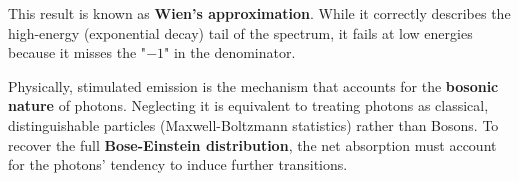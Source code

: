 This result is known as \textbf{Wien's approximation}. While it correctly describes the high-energy (exponential decay) tail of the spectrum, it fails at low energies because it misses the "$-1$" in the denominator. 

Physically, stimulated emission is the mechanism that accounts for the \textbf{bosonic nature} of photons. Neglecting it is equivalent to treating photons as classical, distinguishable particles (Maxwell-Boltzmann statistics) rather than Bosons. To recover the full \textbf{Bose-Einstein distribution}, the net absorption must account for the photons' tendency to induce further transitions.
